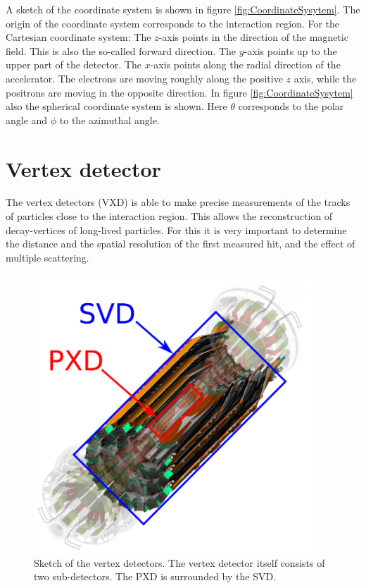 \documentclass[a4paper,11pt,twosided,final,german,openbib,pdftex,listof=totoc,bibliography=totoc]{scrbook}
\begin{document}
A sketch of the coordinate system is shown in figure \ref{fig:CoordinateSysytem}. The origin of the coordinate system corresponds to the interaction region. For the Cartesian coordinate system: The $z$-axis points in the direction of the magnetic field. This is also the so-called forward direction. The $y$-axis points up to the upper part of the detector. The $x$-axis points along the radial direction of the accelerator. The electrons are moving roughly along the positive $z$ axis, while the positrons are moving in the opposite direction. In figure \ref{fig:CoordinateSysytem} also the spherical coordinate system is shown. Here $\theta$ corresponds to the polar angle and $\phi$ to the azimuthal angle.\cite{DevelopVertex}

\section{Vertex detector}
\label{sec:vertexDet}

The vertex detectors (VXD) is able to make precise measurements of the tracks of particles close to the interaction region. This allows the reconstruction of decay-vertices of long-lived particles. For this it is very important to determine the distance and the spatial resolution of the first measured hit, and the effect of multiple scattering.


\begin{figure}[h!]
	\begin{center}
		\includegraphics[width=10.5cm]{Bilder/PXD_SVD}
	\end{center}
\caption[Vertex Detector]{Sketch of the vertex detectors. The vertex detector itself consists of two sub-detectors. The PXD is surrounded by the SVD. \cite{OnlineDataReduction} }
\label{fig:VertexDet}
\end{figure}
\end{document}
